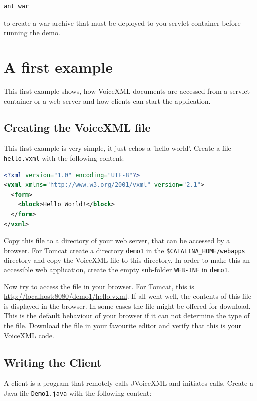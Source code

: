 \documentclass[11pt,a4paper]{article}
\begin{document}
\begin{lstlisting}
ant war
\end{lstlisting}

to create a war archive that must be deployed to you servlet container
before running the demo.

\section{A first example}

This first example shows, how VoiceXML documents are accessed from a
servlet container or a web server and how clients can start the application.

\subsection{Creating the VoiceXML file}
\label{sec:hello-vxml}

This first example is very simple, it just echos a 'hello world'.
Create a file \texttt{hello.vxml} with the following content:

\begin{lstlisting}[language=XML]
<?xml version="1.0" encoding="UTF-8"?> 
<vxml xmlns="http://www.w3.org/2001/vxml" version="2.1">
  <form>
    <block>Hello World!</block>
  </form>
</vxml>
\end{lstlisting}

Copy this file to a directory of your web server, that can be accessed
by a browser. For Tomcat create a directory \texttt{demo1} in
the \texttt{\$CATALINA\_HOME/web\-apps} directory and copy the VoiceXML
file to this directory. In order to make this
an accessible web application, create the empty sub-folder \texttt{WEB-INF}
in \texttt{demo1}.

Now try to access the file in your browser. For Tomcat, this is
\url{http://localhost:8080/demo1/hello.vxml}. If all went well, the
contents of this file is displayed in the browser. In some cases the file
might be offered for download. This is the default behaviour of your browser if
it can not determine the type of the file. Download the file in your
favourite editor and verify that this is your VoiceXML code.

\subsection{Writing the Client}

A client is a program that remotely calls JVoiceXML and initiates calls. Create 
a Java file \texttt{Demo1.java} with the following content:
\end{document}
